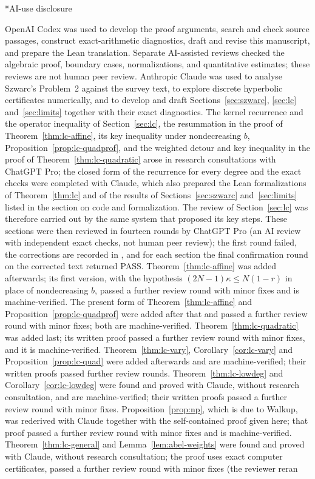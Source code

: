 \documentclass[twoside,10pt]{article}
\makeatletter
\numberwithin{equation}{section}
\theoremstyle{slbody}
\theoremstyle{definition}
\theoremstyle{remark}
\renewcommand{\section}{\@startsection{section}{1}{\z@}{-3.5ex \@plus -1ex \@minus -.2ex}{2.3ex \@plus .2ex}{\normalfont\large\bfseries}}
\makeatother
\begin{document}
\section*{AI-use disclosure}

OpenAI Codex was used to develop the proof arguments, search and check source passages, construct exact-arithmetic diagnostics, draft and revise this manuscript, and prepare the Lean translation. Separate AI-assisted reviews checked the algebraic proof, boundary cases, normalizations, and quantitative estimates; these reviews are not human peer review. Anthropic Claude was used to analyse Szwarc's Problem~2 against the survey text, to explore discrete hyperbolic certificates numerically, and to develop and draft Sections~\ref{sec:szwarc}, \ref{sec:lc} and~\ref{sec:limits} together with their exact diagnostics. The kernel recurrence and the operator inequality of Section~\ref{sec:lc}, the resummation in the proof of Theorem~\ref{thm:lc-affine}, its key inequality under nondecreasing $b$, Proposition~\ref{prop:lc-quadprof}, and the weighted detour and key inequality in the proof of Theorem~\ref{thm:lc-quadratic} arose in research consultations with ChatGPT Pro; the closed form of the recurrence for every degree and the exact checks were completed with Claude, which also prepared the Lean formalizations of Theorem~\ref{thm:lc} and of the results of Sections~\ref{sec:szwarc} and~\ref{sec:limits} listed in the section on code and formalization. The review of Section~\ref{sec:lc} was therefore carried out by the same system that proposed its key steps. These sections were then reviewed in fourteen rounds by ChatGPT Pro (an AI review with independent exact checks, not human peer review); the first round failed, the corrections are recorded in , and for each section the final confirmation round on the corrected text returned PASS. Theorem~\ref{thm:lc-affine} was added afterwards; its first version, with the hypothesis $(2N-1)\kappa\leq N(1-r)$ in place of nondecreasing $b$, passed a further review round with minor fixes and is machine-verified. The present form of Theorem~\ref{thm:lc-affine} and Proposition~\ref{prop:lc-quadprof} were added after that and passed a further review round with minor fixes; both are machine-verified. Theorem~\ref{thm:lc-quadratic} was added last; its written proof passed a further review round with minor fixes, and it is machine-verified. Theorem~\ref{thm:lc-vary}, Corollary~\ref{cor:lc-vary} and Proposition~\ref{prop:lc-quad} were added afterwards and are machine-verified; their written proofs passed further review rounds. Theorem~\ref{thm:lc-lowdeg} and Corollary~\ref{cor:lc-lowdeg} were found and proved with Claude, without research consultation, and are machine-verified; their written proofs passed a further review round with minor fixes. Proposition~\ref{prop:np}, which is due to Walkup, was rederived with Claude together with the self-contained proof given here; that proof passed a further review round with minor fixes and is machine-verified. Theorem~\ref{thm:lc-general} and Lemma~\ref{lem:abel-weights} were found and proved with Claude, without research consultation; the proof uses exact computer certificates, passed a further review round with minor fixes (the reviewer reran 
\end{document}
